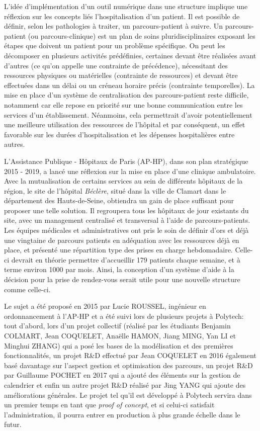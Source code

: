 \documentclass[noposter]{polytech/polytech}
\begin{document}
L'idée d'implémentation d'un outil numérique dans une structure implique une réflexion sur les concepts liés l'hospitalisation d'un patient. Il est possible de définir, selon les pathologies à traiter, un parcours-patient à suivre. Un parcours-patient (ou parcours-clinique) est un plan de soins pluridisciplinaires exposant les étapes que doivent un patient pour un problème spécifique. On peut les décomposer en plusieurs activités prédéfinies, certaines devant être réalisées avant d'autres (ce qu'on appelle une contrainte de précédence), nécessitant des ressources physiques ou matérielles (contrainte de ressources) et devant être effectuées dans un délai ou un créneau horaire précis (contrainte temporelles). La mise en place d'un système de centralisation des parcours-patient reste difficile, notamment car elle repose en priorité sur une bonne communication entre les services d'un établissement. Néanmoins, cela permettrait d'avoir potentiellement une meilleure utilisation des ressources de l'hôpital et par conséquent, un effet favorable sur les durées d'hospitalisation et les dépenses hospitalières entre autres.

L'Assistance Publique - Hôpitaux de Paris (AP-HP), dans son plan stratégique 2015 - 2019, a lancé une réflexion sur la mise en place d'une clinique ambulatoire. Avec la mutualisation de certains services au sein de différents hôpitaux de la région, le site de l'hôpital \textit{Béclère}, situé dans la ville de Clamart dans le département des Hauts-de-Seine, obtiendra un gain de place suffisant pour proposer une telle solution. Il regroupera tous les hôpitaux de jour existants du site, avec un management centralisé et transversal à l'aide de parcours-patients. Les équipes médicales et administratives ont pris le soin de définir d'ors et déjà une vingtaine de parcours patients en adéquation avec les ressources déjà en place, et présenté une répartition type des prises en charge hebdomadaire. Celle-ci devrait en théorie permettre d'accueillir 179 patients chaque semaine, et à terme environ 1000 par mois. Ainsi, la conception d'un système d'aide à la décision pour la prise de rendez-vous serait utile pour une nouvelle structure comme celle-ci.

Le sujet a été proposé en 2015 par Lucie ROUSSEL, ingénieur en ordonnancement à l'AP-HP et a été suivi lors de plusieurs projets à Polytech: tout d'abord, lors d'un projet collectif (réalisé par les étudiants Benjamin COLMART, Jean COQUELET, Anaëlle HAMON, Jiang MING, Yan LI et Minghui ZHANG) qui a posé les bases de la modélisation et des premières fonctionnalités, un projet R\&D effectué par Jean COQUELET en 2016 également basé davantage sur l'aspect gestion et optimisation des parcours, un projet R\&D par Guillaume POCHET en 2017 qui a ajouté des éléments sur la gestion de calendrier et enfin un autre projet R\&D réalisé par Jing YANG qui ajoute des améliorations générales. Le projet tel qu'il est développé à Polytech servira dans un premier temps en tant que \textit{proof of concept}, et si celui-ci satisfait l'administration, il pourra entrer en production à plus grande échelle dans le futur.
\end{document}
